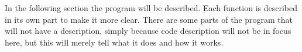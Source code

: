 In the following section the program will be described. Each function is described in its own part to make it more clear. There are some parts of the program that will not have a description, simply because code description will not be in focus here, but this will merely tell what it does and how it works.